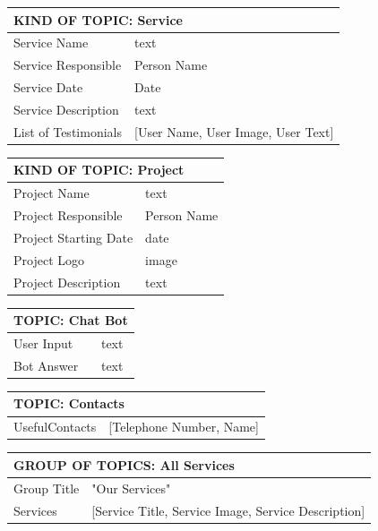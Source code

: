 \begin{tabular}{ |p{5cm}|p{6cm}| }
    \hline
    \multicolumn{2}{|l|}{\textbf{KIND OF TOPIC: Service}} \\
    \hline
    Service Name & text \\
    \hline
    Service Responsible & Person Name \\
    \hline
    Service Date & Date \\
    \hline
    Service Description & text \\
    \hline
    List of Testimonials & [User Name, User Image, User Text] \\
    \hline
\end{tabular}

\begin{tabular}{ |p{5cm}|p{6cm}| }
    \hline
    \multicolumn{2}{|l|}{\textbf{KIND OF TOPIC: Project}} \\
    \hline
    Project Name & text \\
    \hline
    Project Responsible & Person Name \\
    \hline
    Project Starting Date & date \\
    \hline
    Project Logo & image \\
    \hline
    Project Description & text\\
    \hline
\end{tabular}

\begin{tabular}{ |p{5cm}|p{6cm}| }
    \hline
    \multicolumn{2}{|l|}{\textbf{TOPIC: Chat Bot}} \\
    \hline
    User Input & text \\
    \hline
    Bot Answer & text \\
    \hline
\end{tabular}

\begin{tabular}{ |p{5cm}|p{6cm}| }
    \hline
    \multicolumn{2}{|l|}{\textbf{TOPIC: Contacts}} \\
    \hline
    UsefulContacts & [Telephone Number, Name]\\
    \hline
\end{tabular}

\begin{tabular}{ |p{5cm}|p{6cm}| }
    \hline
    \multicolumn{2}{|l|}{\textbf{GROUP OF TOPICS: All Services}} \\
    \hline
    Group Title & "Our Services" \\
    \hline
    Services & [Service Title, Service Image, Service Description] \\
    \hline
\end{tabular}

